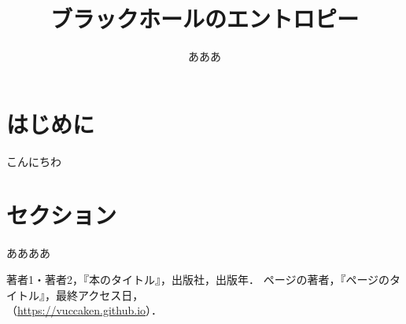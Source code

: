 \documentclass[uplatex,dvipdfmx]{vkaishi}
\begin{document}
\title{ブラックホールのエントロピー}%
\author[中山]{あああ}%

\maketitle %



\section*{はじめに}
こんにちわ


\section{セクション}
ああああ


\begin{thebibliography}{99}
   著者1・著者2，『本のタイトル』，出版社，出版年．
   ページの著者，『ページのタイトル』，最終アクセス日，\\（\url{https://vuccaken.github.io}）．
\end{thebibliography}
\end{document}
